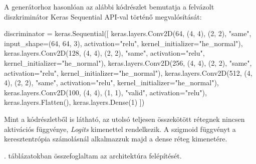 A generátorhoz hasonlóan az alábbi kódrészlet bemutatja a felvázolt diszkriminátor Keras Sequential API-val történő megvalósítását:
\begin{python}
discriminator = keras.Sequential([
    keras.layers.Conv2D(64, (4, 4), (2, 2), "same",
                        input_shape=(64, 64, 3), activation="relu",
                        kernel_initializer="he_normal"),
    keras.layers.Conv2D(128, (4, 4), (2, 2), "same", activation="relu",
                        kernel_initializer="he_normal"),
    keras.layers.Conv2D(256, (4, 4), (2, 2), "same", activation="relu",
                        kernel_initializer="he_normal"),
    keras.layers.Conv2D(512, (4, 4), (2, 2), "same", activation="relu",
                        kernel_initializer="he_normal"),
    keras.layers.Conv2D(100, (4, 4), (1, 1), "valid", activation="relu"),
    keras.layers.Flatten(),
    keras.layers.Dense(1)
])
\end{python}

Mint a kódrészletből is látható, az utolsó teljesen összekötött rétegnek nincsen aktivációs függvénye, \textit{Logits} kimenettel rendelkezik. A szigmoid függvényt a keresztentrópia számolásnál alkalmazzuk majd a dense réteg kimenetére.

. táblázatokban összefoglaltam az architektúra felépítését.

